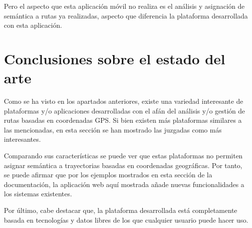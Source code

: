 Pero el aspecto que esta aplicación móvil no realiza es el análisis y asignación de semántica a rutas ya realizadas, aspecto que diferencia la plataforma desarrollada con esta aplicación.


\section{Conclusiones sobre el estado del arte}

Como se ha visto en los apartados anteriores, existe una variedad interesante de plataformas y/o aplicaciones desarrolladas con el afán del análisis y/o gestión de rutas basadas en coordenadas GPS. Si bien existen más plataformas similares a las mencionadas, en esta sección se han mostrado las juzgadas como más interesantes.

Comparando sus características se puede ver que estas plataformas no permiten asignar semántica a trayectorias basadas en coordenadas geográficas. Por tanto, se puede afirmar que por los ejemplos mostrados en esta sección de la documentación, la aplicación web aquí mostrada añade nuevas funcionalidades a los sistemas existentes.

Por último, cabe destacar que, la plataforma desarrollada está completamente basada en tecnologías y datos libres de los que cualquier usuario puede hacer uso.


